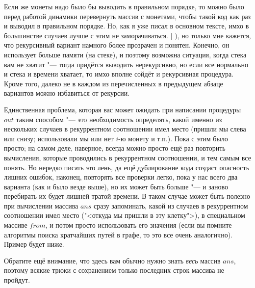 Если же монеты надо было бы выводить в правильном порядке, то можно было перед работой динамики 
перевернуть массив с монетами, чтобы такой код как раз и выводил в правильном порядке. Но, как я 
уже писал в основном тексте, имхо в большинстве случаев лучше с этим не заморачиваться.
|%
), но только мне кажется, что
рекурсивный вариант намного более прозрачен и понятен. Конечно, он использует больше памяти (на
стеке), и поэтому возможна ситуация, когда стека вам не хватит "--- тогда придётся выводить
нерекурсивно, но если все нормально и стека и времени хватает, то имхо вполне сойдёт и рекурсивная
процедура. Кроме того, далеко не в каждом из перечисленных в предыдущем абзаце вариантов можно
избавиться от рекурсии.

Единственная проблема, которая вас может ожидать при написании процедуры $out$ таким способом "---
это необходимость определять, какой именно из нескольких случаев в рекуррентном соотношении имел
место (пришли мы слева или снизу; использовали мы или нет $i$-ю монету и т.п.). Пока с этим было
просто; на самом деле, наверное, всегда можно просто ещё раз повторить вычисления, которые
проводились в рекуррентном соотношении, и тем самым все понять. Но нередко писать это лень, да ещё
дублирование кода создаст опасность лишних ошибок, наконец, повторять все проверки легко, пока у нас
всего два варианта (как и было везде выше), но их может быть больше "--- и заново перебирать их
будет лишней тратой времени. В таком случае может быть полезно при вычислении массива $ans$ сразу
запоминать, какой из случаев в рекуррентном соотношении имел место ("<откуда мы пришли в эту
клетку">), в специальном массиве $from$, и потом просто использовать его значения (если вы помните
алгоритмы поиска кратчайших путей в графе, то это все очень аналогично). Пример будет ниже.

Обратите ещё внимание, что здесь вам обычно нужно знать \textit{весь} массив $ans$, поэтому
всякие трюки с сохранением только последних строк массива не пройдут.

